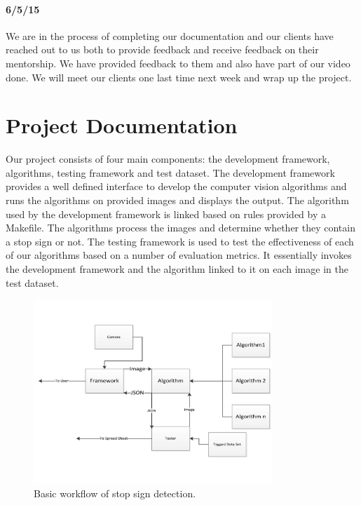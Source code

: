 \documentclass[letterpaper,10pt,titlepage]{article}
\begin{document}
    \paragraph*{6/5/15}
    We are in the process of completing our documentation and our clients have
    reached out to us both to provide feedback and receive feedback on their
    mentorship. We have provided feedback to them and also have part of our 
    video done. We will meet our clients one last time next week and wrap up
    the project.
\section*{Project Documentation}
Our project consists of four main components: the development framework, 
algorithms, testing framework and test dataset. The development framework
provides a well defined interface to develop the computer vision algorithms and
runs the algorithms on provided images and displays the output. The algorithm 
used by the development framework is linked based on rules provided by a 
Makefile. The algorithms process the images and determine whether they contain
a stop sign or not. The testing framework is used to test the effectiveness of
each of our algorithms based on a number of evaluation metrics. It essentially
invokes the development framework and the algorithm linked to it on each image
in the test dataset.

\begin{figure}[H]
    \centering
    \includegraphics[width=0.8\textwidth]{dataflow.pdf}
    \caption{Basic workflow of stop sign detection.}
\end{figure}
\end{document}
